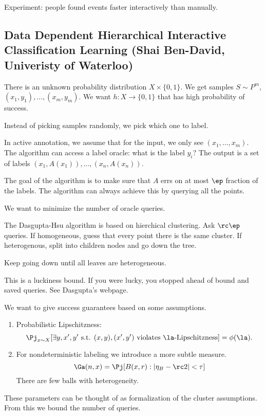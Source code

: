 
Experiment: people found events faster interactively than manually.


\subsection{Data Dependent Hierarchical Interactive Classification Learning (Shai Ben-David, Univeristy of Waterloo)}


There is an unknown probability distribution $X\times\{0,1\}$. We get samples $S\sim P^m$, $(x_1,y_1),\ldots, (x_m,y_m)$.  We want $h:X\to \{0,1\}$ that has high probability of success.

Instead of picking samples randomly, we pick which one to label.


In active annotation, we assume that for the input, we only see $(x_1,\ldots, x_m)$. 
The algorithm can access a label oracle: what is the label $y_i$? The output is a set of labels $(x_1,A(x_1)),\ldots, (x_n,A(x_n))$.

The goal of the algorithm is to make sure that $A$ errs on at most $\ep$ fraction of the labels. The algorithm can always achieve this by querying all the points. 

We want to minimize the number of oracle queries.


The Dasgupta-Hsu algorithm is based on hierchical clustering. %
Ask $\rc\ep$ queries. If homogeneous, guess that every point there is the same cluster. If heterogenous, split into children nodes and go down the tree.

Keep going down until all leaves are heterogeneous.

This is a luckiness bound. If you were lucky, you stopped ahead of bound and saved queries. See Dasgupta's webpage.
		
We want to give success guarantees based on some assumptions.
\begin{enumerate}
\item
Probabilistic Lipschitzness: 
$$
\Pj_{x\sim X} [\exists y, x',y' \text{ s.t. } (x,y), (x',y') \text{ violates $\la$-Lipschitzness}] = \phi(\la).
$$
\item
For nondeterministic labeling we introduce a more subtle measure.
$$
\Ga (n,x)=\Pj[B(x,r):|\eta_B-\rc 2|<\tau]
$$
There are few balls with heterogeneity.
\end{enumerate}
These parameters can be thought of as formalization of the cluster assumptions. From this we bound the number of queries.


